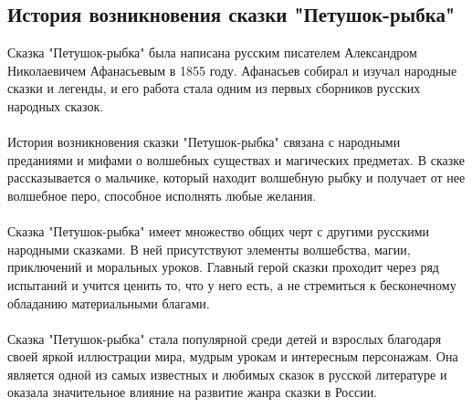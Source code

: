 \documentclass{article}
\begin{document}
\subsection{История возникновения сказки "{}{}Петушок-рыбка"{}{}}
Сказка "{}{}Петушок-рыбка"{}{} была написана русским писателем Александром Николаевичем Афанасьевым в 1855 году. Афанасьев собирал и изучал народные сказки и легенды, и его работа стала одним из первых сборников русских народных сказок.\\
~\\
История возникновения сказки "{}{}Петушок-рыбка"{}{} связана с народными преданиями и мифами о волшебных существах и магических предметах. В сказке рассказывается о мальчике, который находит волшебную рыбку и получает от нее волшебное перо, способное исполнять любые желания.\\
~\\
Сказка "{}{}Петушок-рыбка"{}{} имеет множество общих черт с другими русскими народными сказками. В ней присутствуют элементы волшебства, магии, приключений и моральных уроков. Главный герой сказки проходит через ряд испытаний и учится ценить то, что у него есть, а не стремиться к бесконечному обладанию материальными благами.\\
~\\
Сказка "{}{}Петушок-рыбка"{}{} стала популярной среди детей и взрослых благодаря своей яркой иллюстрации мира, мудрым урокам и интересным персонажам. Она является одной из самых известных и любимых сказок в русской литературе и оказала значительное влияние на развитие жанра сказки в России.
\end{document}
